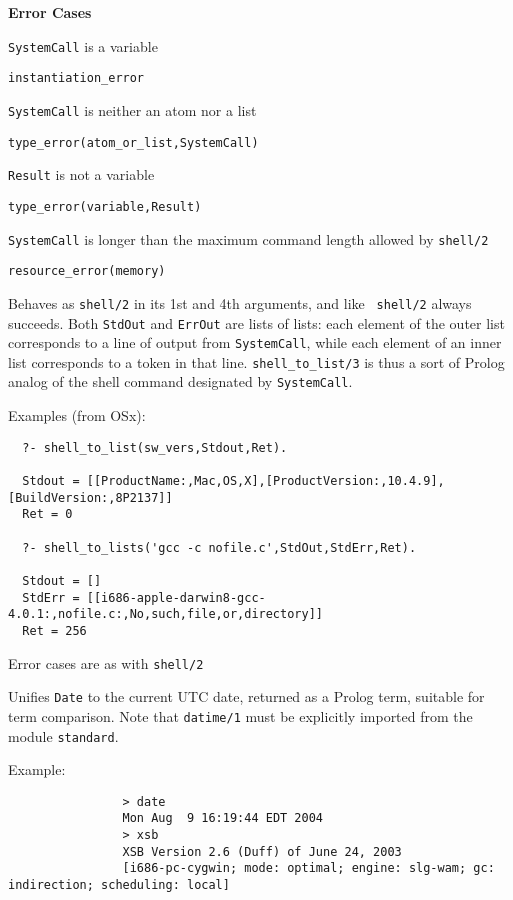 \begin{description}
{\bf Error Cases}
\bi
\item  {\tt SystemCall} is a variable
\bi
\item {\tt instantiation\_error}
\ei
\item {\tt SystemCall} is neither an atom nor a list
\bi
\item {\tt type\_error(atom\_or\_list,SystemCall)}
\ei
\item {\tt Result} is not a variable
\bi
\item {\tt type\_error(variable,Result)}
\ei
\item {\tt SystemCall} is longer than the maximum command length
  allowed by {\tt shell/2}
\bi
\item {\tt resource\_error(memory)}
\ei
\ei


%
Behaves as {\tt shell/2} in its 1st and 4th arguments, and like {\tt
  shell/2} always succeeds.  Both {\tt StdOut} and {\tt ErrOut} are
lists of lists: each element of the outer list corresponds to a line
of output from {\tt SystemCall}, while each element of an inner list
corresponds to a token in that line.  {\tt shell\_to\_list/3} is thus
a sort of Prolog analog of the shell command designated by \verb|SystemCall|.

Examples (from OSx):
\begin{verbatim}
  ?- shell_to_list(sw_vers,Stdout,Ret).

  Stdout = [[ProductName:,Mac,OS,X],[ProductVersion:,10.4.9],[BuildVersion:,8P2137]]
  Ret = 0

  ?- shell_to_lists('gcc -c nofile.c',StdOut,StdErr,Ret).

  Stdout = []
  StdErr = [[i686-apple-darwin8-gcc-4.0.1:,nofile.c:,No,such,file,or,directory]]
  Ret = 256
\end{verbatim}

Error cases are as with {\tt shell/2}

%
Unifies {\tt Date} to the current UTC date, returned as a Prolog term,
suitable for term comparison.  Note that {\tt datime/1} must be
explicitly imported from the module {\tt standard}.

Example:
{\footnotesize
\begin{verbatim}
                > date
                Mon Aug  9 16:19:44 EDT 2004
                > xsb
                XSB Version 2.6 (Duff) of June 24, 2003
                [i686-pc-cygwin; mode: optimal; engine: slg-wam; gc: indirection; scheduling: local]


\end{verbatim}}
\end{description}
